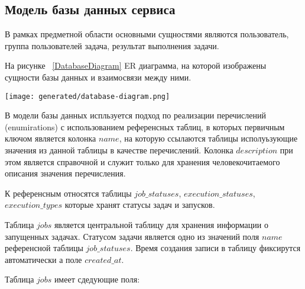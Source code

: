 \subsection{Модель базы данных сервиса}

В рамках предметной области основными сущностями являются пользователь, группа пользователей задача, результат выполнения задачи.

На рисунке ~\ref{DatabaseDiagram} ER диаграмма, на которой изображены сущности базы данных и взаимосвязи между ними.

\begin{figure*}[!t]
  \centering
  \texttt{[image: generated/database-diagram.png]}
  \caption{Диаграмма отношений таблиц базы данных}
  \label{DatabaseDiagram}
\end{figure*}

В модели базы данных испльзуется подход по реализации перечислений (enumirations) с использованием референсных таблиц, в которых первичным ключом является колонка $name$, на которую ссылаются таблицы исполуьзующие значения из данной таблицы в качестве перечислений.
Колонка $description$ при этом является справочной и служит только для хранения человекочитаемого описания значения перечисления.

К референсным относятся таблицы $job\_statuses$, $execution\_statuses$, \linebreak $execution\_types$ которые хранят статусы задач и запусков.

Таблица $jobs$ является центральной таблицу для хранения информации о запущенных задачах. Статусом задачи является одно из значений поля $name$ референсной таблицы $job\_statuses$.
Время создания записи в таблицу фиксирутся автоматически а поле $created\_at$.

Таблица $jobs$ имеет сдедующие поля:

